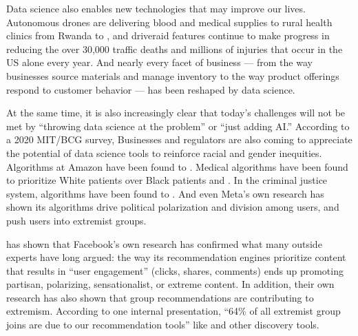 \documentclass[letterpaper,10pt,english]{jupyterBook}
\begin{document}
\sphinxAtStartPar
Data science also enables new technologies that may improve our lives. Autonomous drones are delivering blood and medical supplies to rural health clinics from Rwanda to , and driver\sphinxhyphen{}aid features continue to make progress in reducing the over 30,000 traffic deaths and millions of injuries that occur in the US alone every year. And nearly every facet of business — from the way businesses source materials and manage inventory to the way product offerings respond to customer behavior — has been reshaped by data science.

\sphinxAtStartPar
At the same time, it is also increasingly clear that today’s challenges will not be met by “throwing data science at the problem” or “just adding AI.” According to a 2020 MIT/BCG survey,  Businesses and regulators are also coming to appreciate the potential of data science tools to reinforce racial and gender inequities. Algorithms at Amazon have been found to . Medical algorithms have been found to prioritize White patients over Black patients  and . In the criminal justice system, algorithms have been found to . And even Meta’s own research has shown its algorithms drive political polarization and division among users, and push users into extremist groups.%
\begin{footnote}[1]\sphinxAtStartFootnote
{} has shown that Facebook’s own research has confirmed what many outside experts have long argued: the way its recommendation engines prioritize content that results in “user engagement” (clicks, shares, comments) ends up promoting partisan, polarizing, sensationalist, or extreme content. In addition, their own research has also shown that group recommendations are contributing to extremism. According to one internal presentation, “64\% of all extremist group joins are due to our recommendation tools” like  and other discovery tools.
%
\end{footnote}
\end{document}
